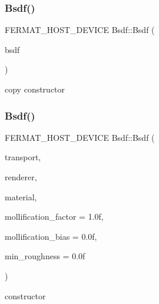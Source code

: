 \subsubsection{\texorpdfstring{Bsdf()}{Bsdf()}\hspace{0.1cm}{\footnotesize\ttfamily [2/4]}}
{\footnotesize\ttfamily F\+E\+R\+M\+A\+T\+\_\+\+H\+O\+S\+T\+\_\+\+D\+E\+V\+I\+CE Bsdf\+::\+Bsdf (\begin{DoxyParamCaption}\item[{const \hyperlink{struct_bsdf}{Bsdf} \&}]{bsdf }\end{DoxyParamCaption})\hspace{0.3cm}{\ttfamily [inline]}}

copy constructor \mbox{\label{struct_bsdf_ae7c0dd3d4267fa567067e4e2218c6a2b}} 
\subsubsection{\texorpdfstring{Bsdf()}{Bsdf()}\hspace{0.1cm}{\footnotesize\ttfamily [3/4]}}
{\footnotesize\ttfamily F\+E\+R\+M\+A\+T\+\_\+\+H\+O\+S\+T\+\_\+\+D\+E\+V\+I\+CE Bsdf\+::\+Bsdf (\begin{DoxyParamCaption}\item[{const \hyperlink{group___b_s_d_f_module_gaca1e72535e7f260e54ed8bbf984dade9}{Transport\+Type}}]{transport,  }\item[{const \hyperlink{struct_rendering_context_view}{Rendering\+Context\+View}}]{renderer,  }\item[{const \hyperlink{struct_mesh_material}{Mesh\+Material}}]{material,  }\item[{const float}]{mollification\+\_\+factor = {\ttfamily 1.0f},  }\item[{const float}]{mollification\+\_\+bias = {\ttfamily 0.0f},  }\item[{const float}]{min\+\_\+roughness = {\ttfamily 0.0f} }\end{DoxyParamCaption})\hspace{0.3cm}{\ttfamily [inline]}}

constructor \mbox{\label{struct_bsdf_a53df9a2f9d7cf9384ce29d2fe061a383}} 
